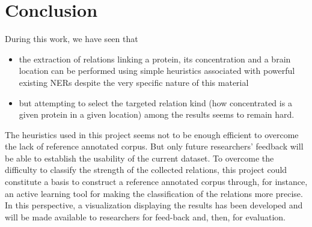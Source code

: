 \documentclass{report}
\begin{document}
			
                \chapter{Conclusion}
                \label{chap:conclusion}
				During this work, we have seen that
				\begin{itemize}
					\item 	the extraction of relations linking a protein, its concentration and a brain location
							can be performed using simple heuristics associated with powerful existing NERs despite the very
							specific nature of this material
					\item	but attempting to select the targeted relation
					kind (how concentrated is a given protein in a given
					location) among the results seems to remain hard. 
				\end{itemize}
				
				The heuristics used in this project seems not to be enough
				efficient to overcome the lack of reference annotated 
				corpus. But only future researchers' feedback will be able to 
				establish the usability of the current dataset.
				To overcome the difficulty to classify the strength of the collected relations, this project 
				could constitute a basis to construct a reference annotated
				corpus through, for instance, an active learning tool for making
				the classification of the relations more precise. In this 
				perspective, a visualization displaying the results has been 
				developed and will be made available to researchers
				for feed-back and, then, for evaluation. 



				
\end{document}
